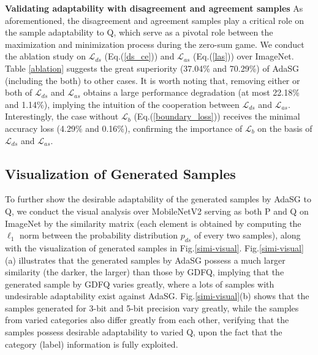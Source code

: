 \textbf{Validating adaptability with disagreement and agreement samples}
As aforementioned, the disagreement and agreement samples play a critical role on the sample adaptability to Q, which serve as a pivotal role between the maximization and minimization process during the zero-sum game. We conduct the ablation study on $\mathcal{L}_{ds}$ (Eq.(\ref{ds_ce})) and $\mathcal{L}_{as} $ (Eq.(\ref{las})) over ImageNet. Table \ref{ablation} suggests the great superiority (37.04\% and 70.29\%) of AdaSG (including the both) to other cases. It is worth noting that, removing either or both of $\mathcal{L}_{ds}$ and $\mathcal{L}_{as} $ obtains a large performance degradation (at most 22.18\% and 1.14\%), implying the intuition of the cooperation between $\mathcal{L}_{ds}$ and $\mathcal{L}_{as} $.
Interestingly, the case without $\mathcal{L}_b$ (Eq.(\ref{boundary_loss})) receives the minimal accuracy loss (4.29\% and 0.16\%), confirming the importance of $\mathcal{L}_b$ on the basis of $\mathcal{L}_{ds}$ and $\mathcal{L}_{as}$.










\subsection{Visualization of Generated Samples}
To further show the desirable adaptability of the generated samples by AdaSG to Q, we conduct the visual analysis over MobileNetV2 serving as both P and Q on ImageNet by the similarity matrix (each element is obtained by computing the $\ell_1$ norm between the probability distribution $p_{ds}$ of every two samples), along with the visualization of generated samples in Fig.\ref{simi-visual}. Fig.\ref{simi-visual}(a) illustrates that the generated samples by AdaSG possess a much larger similarity (the darker, the larger) than those by GDFQ, implying that the generated sample by GDFQ varies greatly, where a lots of samples with undesirable adaptability exist against AdaSG. Fig.\ref{simi-visual}(b) shows that the samples generated for 3-bit and 5-bit precision vary greatly, while the samples from varied categories also differ greatly from each other, verifying that the samples possess desirable adaptability to varied Q, upon the fact that the category (label) information is fully exploited.









